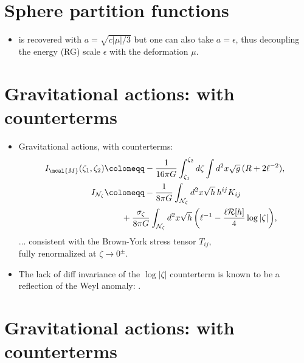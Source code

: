 \documentclass[11pt]{article}
\renewenvironment{frame}[1]%
	{\section*{#1}}%
	{}
\begin{document}
\begin{multicols}{3}
\begin{frame}{Sphere partition functions}{%
	\textcite{Donnelly:2018bef,Li:2020zjb}
}
\begin{itemize}
	\item \textcite{Donnelly:2018bef} is recovered with $a = \sqrt{c|\mu|/3}$ but one can also take $a = \epsilon$, thus decoupling the energy (RG) scale $\epsilon$ with the deformation $\mu$. 
\end{itemize}
\end{frame}

\begin{frame}{Gravitational actions: with counterterms}{%
	\textcite{Donnelly:2018bef,Li:2020zjb}
}

\begin{itemize}

\item Gravitational actions, with counterterms:
	\begin{align*}
		I_{\mcal{M}}(\zeta_1, \zeta_2) & \coloneqq - \frac{1}{16\pi G} \int_{\zeta_1}^{\zeta_2} d\zeta \int d^2 x \sqrt{g} \, (R + 2 \ell^{-2}),  %
	\\
		I_{\mathcal N_{\zeta}} & \coloneqq  - \frac{1}{8\pi G} \int_{\mathcal N_{\zeta}} d^2x \sqrt{h}\,h^{ij} K_{ij} 
	\\& \qquad + \frac{\sigma_\zeta}{8\pi G} \int_{\mathcal N_{\zeta}} d^2x \sqrt{h} \, \bigg(\ell^{-1} - \frac{\ell  \mathcal{R}[h]}{4} \log |\zeta| \bigg), %
	\end{align*}
	... consistent with the Brown-York stress tensor $T_{ij}$, \\
	fully renormalized at $\zeta \to 0^\pm$. 
	
	\item The lack of diff invariance of the $\log |\zeta|$ counterterm is known to be a reflection of the Weyl anomaly: \textsl{\citeauthor{Henningson:1998gx,deHaro:2000vlm,Papadimitriou:2010as}}.
	
\end{itemize}

\end{frame}

\begin{frame}{Gravitational actions: with counterterms}{%
	\textcite{Caputa:2020lpa,Li:2020zjb}
}

\begin{itemize}


\end{itemize}
\end{frame}
\end{multicols}
\end{document}
